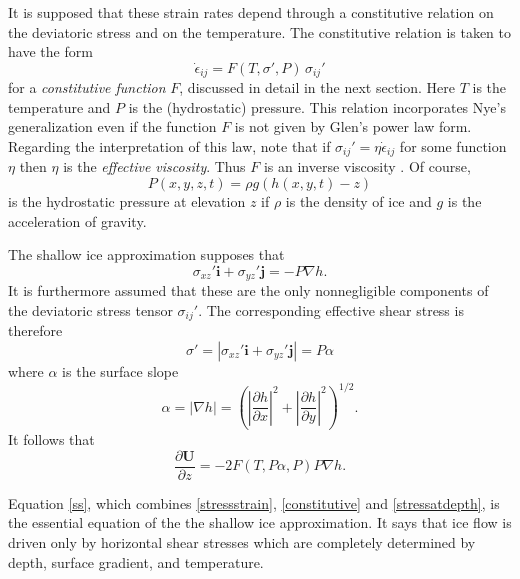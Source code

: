 \documentclass[12pt,final]{amsart}%
\theoremstyle{plain}
\theoremstyle{definition}
\theoremstyle{remark}
\newcommand{\ddx}[1]{\ensuremath{\frac{\partial #1}{\partial x}}}
\newcommand{\ddy}[1]{\ensuremath{\frac{\partial #1}{\partial y}}}
\newcommand{\ddz}[1]{\ensuremath{\frac{\partial #1}{\partial z}}}
\def\eps{\epsilon}
\newcommand{\grad}{\nabla}
\newcommand{\ihat}{\mathbf{i}}
\newcommand{\jhat}{\mathbf{j}}
\newcommand{\bU}{{\mathbf{U}}}
\begin{document}
It is supposed \citep{Fowler,Hutter93} that these strain rates depend through a constitutive relation on the deviatoric stress and on the temperature.  The constitutive relation is taken to have the form
\begin{equation}\label{constitutive}
\dot\eps_{ij}=F(T,\sigma',P)\,\sigma_{ij}'
\end{equation}
for a \emph{constitutive function} $F$, discussed in detail in the next section.  Here $T$ is the temperature and $P$ is the (hydrostatic) pressure.  This relation incorporates Nye's generalization \citep{Nye} even if the function $F$ is not given by Glen's power law \citep{Glen} form.  Regarding the interpretation of this law, note that if $\sigma_{ij}'=\eta \dot\eps_{ij}$ for some function $\eta$ then $\eta$ is the \emph{effective viscosity}.  Thus $F$ is an inverse viscosity \citep{Fowler}. Of course,
\begin{equation}\label{pressure}
P(x,y,z,t)=\rho g (h(x,y,t)-z)
\end{equation}
is the hydrostatic pressure at elevation $z$ if $\rho$ is the density of ice and $g$ is the acceleration of gravity.

The shallow ice approximation supposes that
\begin{equation}\label{stressatdepth}
\sigma_{xz}' \ihat + \sigma_{yz}' \jhat = -P\grad h.
\end{equation}
It is furthermore assumed that these are the only nonnegligible components of the deviatoric stress tensor $\sigma_{ij}'$.  The corresponding effective shear stress is therefore
\begin{equation}\label{effstress}
\sigma' = |\sigma_{xz}' \ihat + \sigma_{yz}' \jhat| = P \alpha
\end{equation}
where $\alpha$ is the surface slope
    $$\alpha = |\grad h| = \left(\left|\ddx{h}\right|^2 + \left|\ddy{h}\right|^2\right)^{1/2}.$$
It follows that
\begin{equation}\label{ss}
\ddz{\bU}=-2 F(T,P\alpha,P) P \grad h.
\end{equation}

Equation \eqref{ss}, which combines \eqref{stressstrain}, \eqref{constitutive} and \eqref{stressatdepth}, is the essential equation of the the shallow ice approximation.  It says that ice flow is driven only by horizontal shear stresses which are completely determined by depth, surface gradient, and temperature.
\end{document}
